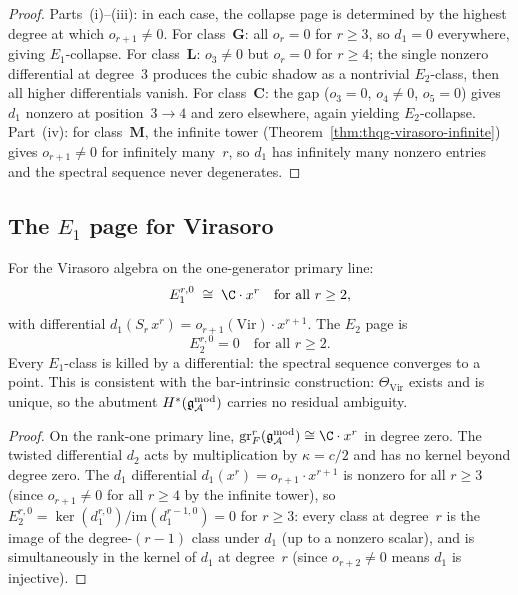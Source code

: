 \begin{proof}
Parts~(i)--(iii): in each case, the collapse page is
determined by the highest degree at which $o_{r+1} \neq 0$.
For class~$\mathbf{G}$: all $o_r = 0$ for $r \geq 3$,
so $d_1 = 0$ everywhere, giving $E_1$-collapse.
For class~$\mathbf{L}$: $o_3 \neq 0$ but $o_r = 0$ for
$r \geq 4$; the single nonzero differential at degree~$3$
produces the cubic shadow as a nontrivial $E_2$-class,
then all higher differentials vanish.
For class~$\mathbf{C}$: the gap ($o_3 = 0$, $o_4 \neq 0$,
$o_5 = 0$) gives $d_1$ nonzero at position~$3 \to 4$ and
zero elsewhere, again yielding $E_2$-collapse.
Part~(iv): for class~$\mathbf{M}$, the infinite tower
(Theorem~\ref{thm:thqg-virasoro-infinite}) gives
$o_{r+1} \neq 0$ for infinitely many~$r$, so $d_1$ has
infinitely many nonzero entries and the spectral sequence
never degenerates.
\end{proof}



\subsection{The $E_1$ page for Virasoro}

\begin{proposition}
\ClaimStatusProvedHere
For the Virasoro algebra on the one-generator primary line:
\begin{equation}%
E_1^{r,0}
\;\cong\;
\C\cdot x^r
\quad\text{for all } r \geq 2,
\end{equation}
with differential $d_1(S_r\,x^r) = o_{r+1}(\mathrm{Vir})
\cdot x^{r+1}$. The $E_2$ page is
\begin{equation}%
E_2^{r,0} = 0
\quad\text{for all } r \geq 2.
\end{equation}
Every $E_1$-class is killed by a differential: the spectral
sequence converges to a point. This is consistent with the
bar-intrinsic construction: $\Theta_{\mathrm{Vir}}$ exists
and is unique, so the abutment $H^*(\mathfrak{g}_{\mathcal{A}}^{\mathrm{mod}})$ carries no
residual ambiguity.
\end{proposition}

\begin{proof}
On the rank-one primary line,
$\operatorname{gr}^r_F(\gAmod) \cong \C\cdot x^r$ in
degree zero. The twisted differential $d_2$ acts by
multiplication by $\kappa = c/2$ and has no kernel beyond
degree zero. The $d_1$ differential
$d_1(x^r) = o_{r+1}\cdot x^{r+1}$ is nonzero for all
$r \geq 3$ (since $o_{r+1} \neq 0$ for all $r \geq 4$
by the infinite tower), so
$E_2^{r,0} = \ker(d_1^{r,0})/\mathrm{im}(d_1^{r-1,0}) = 0$
for $r \geq 3$: every class at degree~$r$ is the image of
the degree-$(r{-}1)$ class under $d_1$ (up to a nonzero
scalar), and is simultaneously in the kernel of $d_1$ at
degree~$r$ (since $o_{r+2} \neq 0$ means $d_1$ is injective).
\end{proof}


